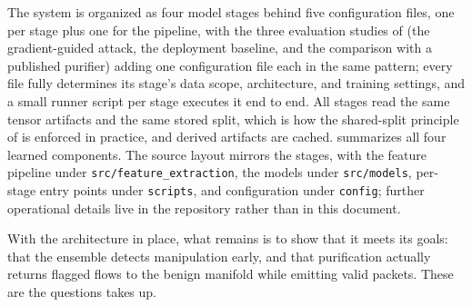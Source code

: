 The system is organized as four model stages behind five configuration files, one per
stage plus one for the pipeline, with the three evaluation studies of
 (the gradient-guided attack, the deployment baseline, and the
comparison with a published purifier) adding one configuration file each in the same
pattern; every file fully determines its stage's
data scope, architecture, and training settings, and a small runner script per stage
executes it end to end. All stages read the same tensor artifacts and the same stored split, which is
how the shared-split principle of  is enforced in practice,
and derived artifacts are cached. 
summarizes all four learned components. The source layout mirrors the stages, with the
feature pipeline under \texttt{src/feature\_extraction}, the models under
\texttt{src/models}, per-stage entry points under \texttt{scripts}, and configuration
under \texttt{config}; further operational details live in the repository rather
than in this document.

With the architecture in place, what remains is to show that it meets its goals: that
the ensemble detects manipulation early, and that purification actually returns
flagged flows to the benign manifold while emitting valid packets. These are the
questions  takes up.
